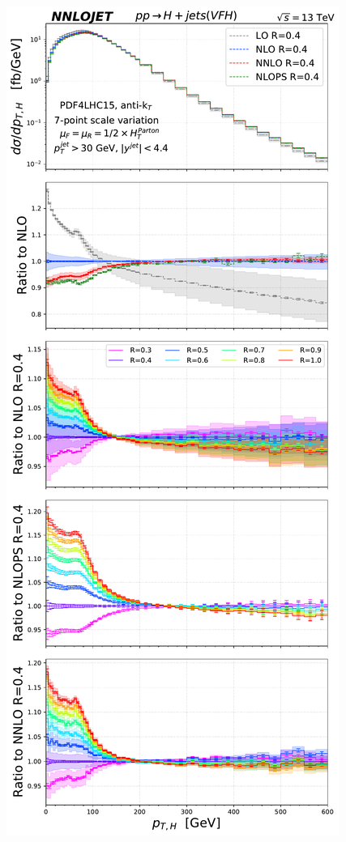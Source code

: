 \documentclass[10pt,prd,fleqn,superscriptaddress,notitlepage,nofootinbib,preprintnumbers,nobalancelastpage]{revtex4-1}
\begin{document}
\begin{figure}[p]
\centering
\includegraphics[scale=0.44]{figures/rdep/LH19VFH_pth_finebin.pdf}\hfill

\end{figure}
\end{document}

